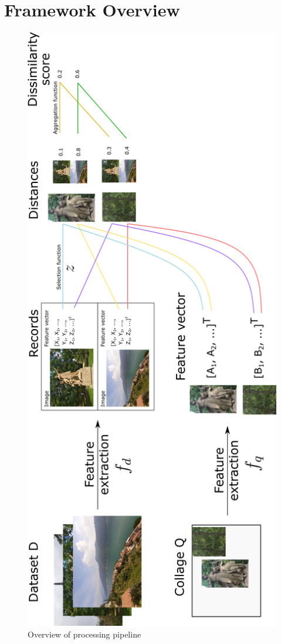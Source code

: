 \section{Framework Overview}

\begin{figure}[p!]
    \centering
    \includegraphics[scale=0.9]{img/features_pipeline.png}
    \caption{Overview of processing pipeline}
    \label{fig:processing_pipeline}
\end{figure}

